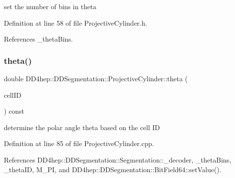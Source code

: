 set the number of bins in theta 



Definition at line 58 of file Projective\+Cylinder.\+h.



References \+\_\+theta\+Bins.

\hypertarget{class_d_d4hep_1_1_d_d_segmentation_1_1_projective_cylinder_ae910cdea40db4b821f9d49627be2833c}{}\label{class_d_d4hep_1_1_d_d_segmentation_1_1_projective_cylinder_ae910cdea40db4b821f9d49627be2833c} 
\subsubsection{\texorpdfstring{theta()}{theta()}\hspace{0.1cm}{\footnotesize\ttfamily [1/2]}}
{\footnotesize\ttfamily double D\+D4hep\+::\+D\+D\+Segmentation\+::\+Projective\+Cylinder\+::theta (\begin{DoxyParamCaption}\item[{const \hyperlink{namespace_d_d4hep_1_1_d_d_segmentation_ac7af071d85cb48820914434a07e21ba1}{Cell\+ID} \&}]{cell\+ID }\end{DoxyParamCaption}) const}



determine the polar angle theta based on the cell ID 



Definition at line 85 of file Projective\+Cylinder.\+cpp.



References D\+D4hep\+::\+D\+D\+Segmentation\+::\+Segmentation\+::\+\_\+decoder, \+\_\+theta\+Bins, \+\_\+theta\+ID, M\+\_\+\+PI, and D\+D4hep\+::\+D\+D\+Segmentation\+::\+Bit\+Field64\+::set\+Value().

\hypertarget{class_d_d4hep_1_1_d_d_segmentation_1_1_projective_cylinder_ad48181a5429e2c54a8a8ee23b17e3ac5}{}\label{class_d_d4hep_1_1_d_d_segmentation_1_1_projective_cylinder_ad48181a5429e2c54a8a8ee23b17e3ac5} 

